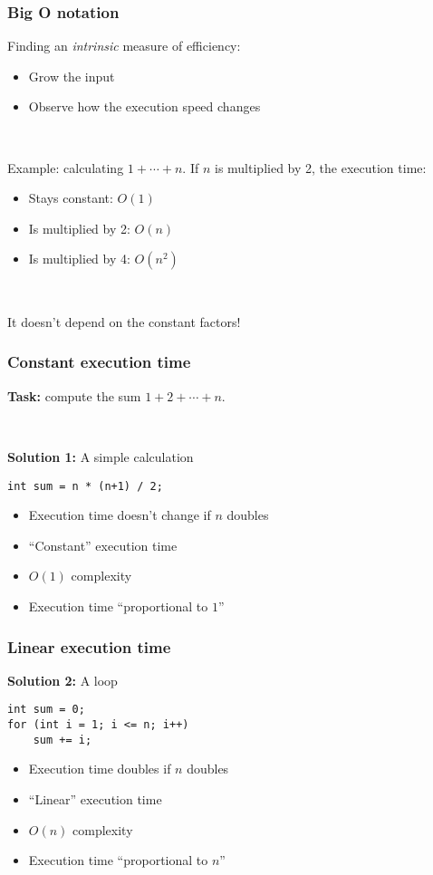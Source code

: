\documentclass[12pt]{beamer}
\begin{document}
\begin{frame}
\frametitle{Big O notation}

Finding an \emph{intrinsic} measure of efficiency:
\begin{itemize}
\item Grow the input
\item Observe how the execution speed changes
\end{itemize}

~

Example: calculating $1+\cdots+n$. If $n$ is multiplied by 2, the execution time:
\begin{itemize}
\item Stays constant: $O(1)$
\item Is multiplied by 2: $O(n)$
\item Is multiplied by 4: $O(n^2)$
\end{itemize}

~

It doesn't depend on the constant factors!
\end{frame}

\begin{frame}[fragile]
\frametitle{Constant execution time}
\textbf{Task:} compute the sum $1+2+\cdots+n$.

~

\textbf{Solution 1:} A simple calculation
\begin{lstlisting}
int sum = n * (n+1) / 2;
\end{lstlisting}
\begin{itemize}
\item Execution time doesn't change if $n$ doubles
\item ``Constant'' execution time
\item $O(1)$ complexity
\item Execution time ``proportional to $1$''
\end{itemize}
\end{frame}

\begin{frame}[fragile]
\frametitle{Linear execution time}
\textbf{Solution 2:} A loop
\begin{lstlisting}
int sum = 0;
for (int i = 1; i <= n; i++)
    sum += i;
\end{lstlisting}
\begin{itemize}
\item Execution time doubles if $n$ doubles
\item ``Linear'' execution time
\item $O(n)$ complexity
\item Execution time ``proportional to $n$''
\end{itemize}
\end{frame}
\end{document}
